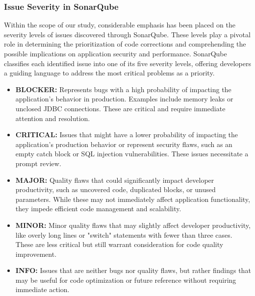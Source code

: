 \subsubsection{Issue Severity in SonarQube}
Within the scope of our study, considerable emphasis has been placed on the severity levels of issues discovered through SonarQube. These levels play a pivotal role in determining the prioritization of code corrections and comprehending the possible implications on application security and performance. SonarQube classifies each identified issue into one of its five severity levels, offering developers a guiding language to address the most critical problems as a priority.
\begin{itemize}
    \item \textbf{BLOCKER:} Represents bugs with a high probability of impacting the application's behavior in production. Examples include memory leaks or unclosed JDBC connections. These are critical and require immediate attention and resolution.
    \item \textbf{CRITICAL:} Issues that might have a lower probability of impacting the application's production behavior or represent security flaws, such as an empty catch block or SQL injection vulnerabilities. These issues necessitate a prompt review.
    \item \textbf{MAJOR:} Quality flaws that could significantly impact developer productivity, such as uncovered code, duplicated blocks, or unused parameters. While these may not immediately affect application functionality, they impede efficient code management and scalability.
    \item \textbf{MINOR:} Minor quality flaws that may slightly affect developer productivity, like overly long lines or "switch" statements with fewer than three cases. These are less critical but still warrant consideration for code quality improvement.
    \item \textbf{INFO:} Issues that are neither bugs nor quality flaws, but rather findings that may be useful for code optimization or future reference without requiring immediate action.
\end{itemize}



